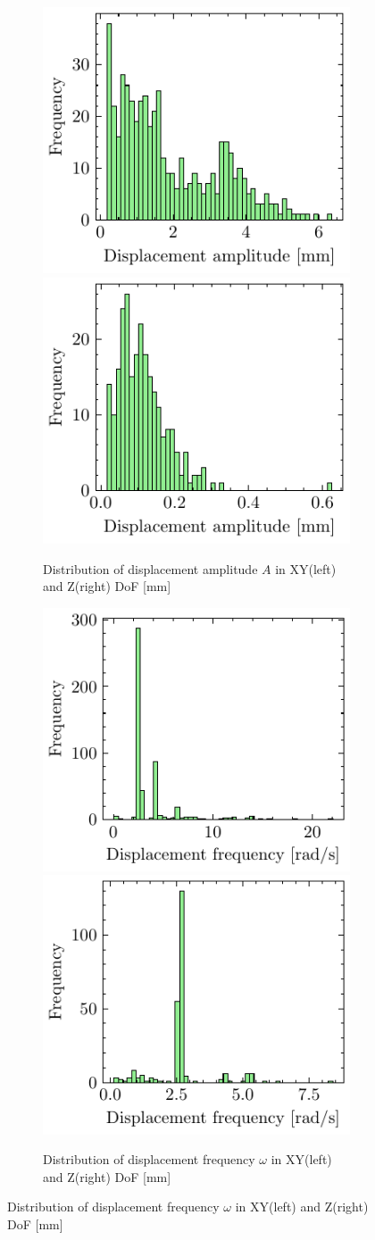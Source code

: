 \begin{figure}[H]
    \begin{subfigure}{\linewidth}
    \includegraphics[width=.5\linewidth]{images/fig_chapter4/data_dist/1.pdf}\hfill
    \includegraphics[width=.5\linewidth]{images/fig_chapter4/data_dist/2.pdf}
    \caption{Distribution of displacement amplitude $ A $ in XY(left) and Z(right) DoF [mm]}
    \end{subfigure}\par\medskip
    
    \begin{subfigure}{\linewidth}
    \includegraphics[width=.5\linewidth]{images/fig_chapter4/data_dist/3.pdf}\hfill
    \includegraphics[width=.5\linewidth]{images/fig_chapter4/data_dist/4.pdf}
    \caption{Distribution of displacement frequency $ \omega $ in XY(left) and Z(right) DoF [mm]}
    \end{subfigure}\par\medskip
    

\end{figure}
